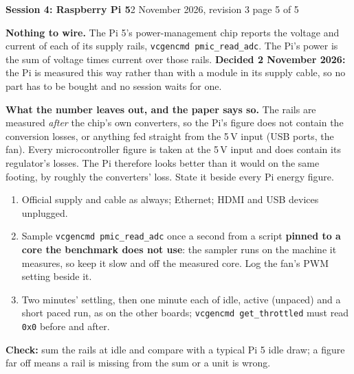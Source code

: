 \documentclass[11pt]{article}
\newcommand{\code}[1]{\texttt{#1}}
\newcommand{\head}[2]{{\Large\bfseries #1}\hfill{\small 2 November 2026, revision 3 \quad #2}\par\smallskip}
\begin{document}
\newpage
\head{Session 4: Raspberry Pi 5}{page 5 of 5}

\textbf{Nothing to wire.} The Pi 5's power-management chip reports the voltage and current of each of its supply rails,
\code{vcgencmd pmic\_read\_adc}. The Pi's power is the sum of voltage times current over those rails. \textbf{Decided
2 November 2026:} the Pi is measured this way rather than with a module in its supply cable, so no part has to be bought
and no session waits for one.

\textbf{What the number leaves out, and the paper says so.} The rails are measured \emph{after} the chip's own converters,
so the Pi's figure does not contain the conversion losses, or anything fed straight from the 5\,V input (USB ports, the
fan). Every microcontroller figure is taken at the 5\,V input and does contain its regulator's losses. The Pi therefore
looks better than it would on the same footing, by roughly the converters' loss. State it beside every Pi energy figure.

\begin{enumerate}
\item Official supply and cable as always; Ethernet; HDMI and USB devices unplugged.
\item Sample \code{vcgencmd pmic\_read\_adc} once a second from a script \textbf{pinned to a core the benchmark does not
use}: the sampler runs on the machine it measures, so keep it slow and off the measured core. Log the fan's PWM setting
beside it.
\item Two minutes' settling, then one minute each of idle, active (unpaced) and a short paced run, as on the other
boards; \code{vcgencmd get\_throttled} must read \code{0x0} before and after.
\end{enumerate}

{\small\textbf{Check:} sum the rails at idle and compare with a typical Pi 5 idle draw; a figure far off means a rail is
missing from the sum or a unit is wrong.}
\end{document}
